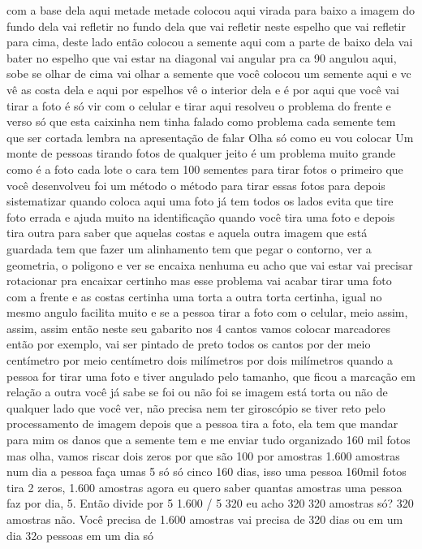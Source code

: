 com a base dela aqui
metade metade
colocou aqui virada para baixo
a imagem do fundo dela
vai refletir no fundo dela
que vai refletir neste espelho
que vai refletir para cima, deste lado
então colocou a semente aqui
com a parte de baixo dela
vai bater no espelho
que vai estar na diagonal
vai angular pra ca 90
angulou aqui, sobe
se olhar de cima
vai olhar a semente que você colocou
um semente aqui e vc vê as costa dela
e aqui por espelhos vê o interior dela
e é por aqui que você vai tirar a foto
é só vir com o celular e tirar aqui
resolveu o problema do frente e verso
só que esta caixinha
nem tinha falado como problema
cada semente
tem que ser cortada
lembra na apresentação de falar
Olha só como eu vou colocar
Um monte de pessoas tirando fotos de qualquer jeito
é um problema muito grande
como é a foto
cada lote o cara tem 100 sementes para tirar fotos
o primeiro que você desenvolveu foi um método
o método para tirar essas fotos
para depois sistematizar
quando coloca aqui uma foto já tem todos os lados
evita que tire foto errada e ajuda muito na identificação
quando
você tira uma foto e depois tira outra
para saber que aquelas costas
e aquela outra imagem que está guardada
tem que fazer um alinhamento
tem que pegar o contorno, ver a geometria, o poligono e ver se encaixa
nenhuma eu acho que vai estar
vai precisar rotacionar
pra encaixar certinho
mas esse problema vai acabar
tirar uma foto com a frente e as costas certinha
uma torta a outra torta certinha, igual no mesmo angulo
facilita
muito
e se a pessoa
tirar a foto com o celular, meio assim, assim, assim
então neste seu gabarito
nos 4 cantos vamos colocar marcadores
então por exemplo, vai ser pintado de preto todos os cantos
por der meio centímetro por meio centímetro
dois milímetros por dois milímetros
quando a pessoa for tirar uma foto
e tiver angulado
pelo tamanho, que ficou a marcação em relação a outra
você já sabe se foi ou não foi
se imagem está torta ou não
de qualquer lado que você ver, não precisa nem ter giroscópio
se tiver reto pelo processamento de imagem
depois que a pessoa tira a foto, ela tem que mandar para mim
os danos que a semente tem
e me enviar tudo organizado
160 mil fotos
mas olha, vamos riscar dois zeros por que são 100 por amostras
1.600 amostras
num dia a pessoa faça
umas 5 só
só cinco
160 dias, isso uma pessoa
160mil fotos
tira 2 zeros, 1.600 amostras
agora eu quero saber quantas amostras uma pessoa faz por dia, 5. Então divide por 5
1.600 / 5
320 eu acho
320
320 amostras
só? 320 amostras
não. Você precisa de 1.600 amostras
vai precisa de 320 dias
ou em um dia 32o pessoas
em um dia só
